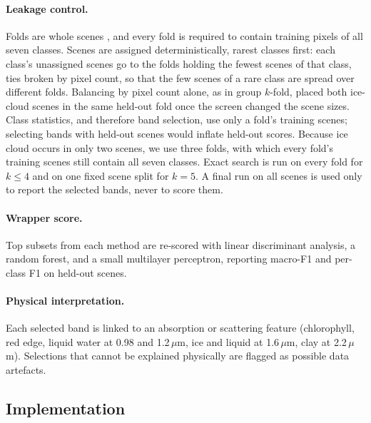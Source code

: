 \documentclass[11pt]{article}
\newcommand{\um}{\,\ensuremath{\mu}m}
\begin{document}
\paragraph{Leakage control.} Folds are whole scenes \citep{roberts2017}, and
every fold is required to contain training pixels of all seven classes. Scenes
are assigned deterministically, rarest classes first: each class's unassigned
scenes go to the folds holding the fewest scenes of that class, ties broken by
pixel count, so that the few scenes of a rare class are spread over different
folds. Balancing by pixel count alone, as in group $k$-fold, placed both
ice-cloud scenes in the same held-out fold once the screen changed the scene
sizes. Class
statistics, and therefore band selection, use only a fold's training scenes;
selecting bands with held-out scenes would inflate held-out scores. Because
ice cloud occurs in only two scenes, we use three folds, with which every
fold's training scenes still contain all seven classes. Exact
search is run on every fold for $k\le4$ and on one fixed scene split for
$k=5$. A final run on all scenes is used only to report the selected bands,
never to score them.

\paragraph{Wrapper score.} Top subsets from each method are re-scored with
linear discriminant analysis, a random forest, and a small multilayer
perceptron, reporting macro-F1 and per-class F1 on held-out scenes.

\paragraph{Physical interpretation.} Each selected band is linked to an
absorption or scattering feature (chlorophyll, red edge, liquid water at 0.98
and 1.2\um, ice and liquid at 1.6\um, clay at 2.2\um). Selections that cannot
be explained physically are flagged as possible data artefacts.

\subsection{Implementation}
\end{document}
